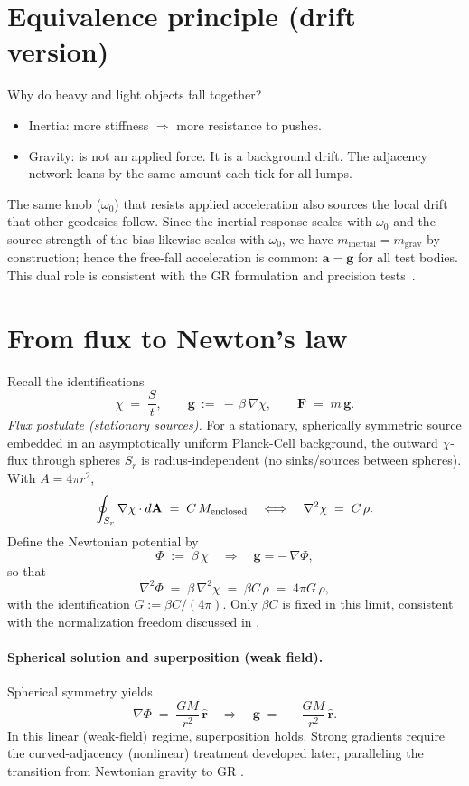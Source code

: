 \section*{Equivalence principle (drift version)}
Why do heavy and light objects fall together?
\begin{itemize}
  \item Inertia: more stiffness $\Rightarrow$ more resistance to pushes.
  \item Gravity: is not an applied force. It is a background drift. The adjacency network leans by the same amount each tick for all lumps.
\end{itemize}
The same knob ($\omega_0$) that resists applied acceleration also sources the
local drift that other geodesics follow. Since the inertial response scales with
$\omega_0$ and the source strength of the bias likewise scales with $\omega_0$,
we have $m_{\text{inertial}} = m_{\text{grav}}$ by construction; hence the
free-fall acceleration is common: $\boldsymbol{a} = \boldsymbol{g}$ for all
test bodies. This dual role is consistent with the GR formulation and precision
tests~\cite{einstein1916foundation,will2014confrontation}.


\section*{From flux to Newton’s law}
Recall the identifications
\[
\chi \;=\; \frac{S}{t},\qquad \mathbf g\ :=\ -\,\beta\,\nabla\chi,\qquad \mathbf F \;=\; m\,\mathbf g.
\]
\emph{Flux postulate (stationary sources).} For a stationary, spherically symmetric source embedded in an asymptotically uniform Planck-Cell background, the outward $\chi$-flux through spheres $S_r$ is radius-independent (no sinks/sources between spheres). With $A=4\pi r^2$,
\[
\oint_{S_r}\nabla\chi\cdot d\mathbf A \;=\; C\,M_{\rm enclosed}
\quad\Longleftrightarrow\quad
\nabla^2\chi \;=\; C\,\rho.
\]
Define the Newtonian potential by
\[
\Phi \;:=\; \beta\,\chi \quad\Rightarrow\quad \mathbf g=-\,\nabla\Phi,
\]
so that
\[
\nabla^2\Phi \;=\; \beta\,\nabla^2\chi \;=\; \beta C\,\rho \;=\; 4\pi G\,\rho,
\]
with the identification \(G := \beta C/(4\pi)\).
Only $\beta C$ is fixed in this limit, consistent with the normalization freedom discussed in \cite{langstaff2025_temporal_relativity_entropy_clock}.

\paragraph{Spherical solution and superposition (weak field).}
Spherical symmetry yields
\[
\nabla\Phi \;=\; \frac{G M}{r^2}\,\hat{\mathbf r}
\quad\Rightarrow\quad
\mathbf g \;=\; -\,\frac{G M}{r^2}\,\hat{\mathbf r}.
\]
In this linear (weak-field) regime, superposition holds. Strong gradients require the curved-adjacency (nonlinear) treatment developed later, paralleling the transition from Newtonian gravity to GR \cite{einstein1916foundation}.

